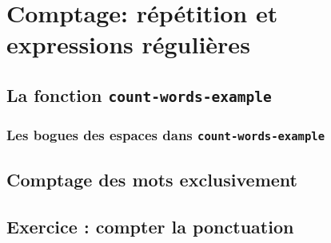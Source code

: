 \chapter{Comptage: répétition et expressions régulières}

\section{La fonction \texttt{count-words-example}}

\subsection{Les bogues des espaces dans
  \texttt{count-words-example}}

\section{Comptage des mots exclusivement}

\section{Exercice : compter la ponctuation}